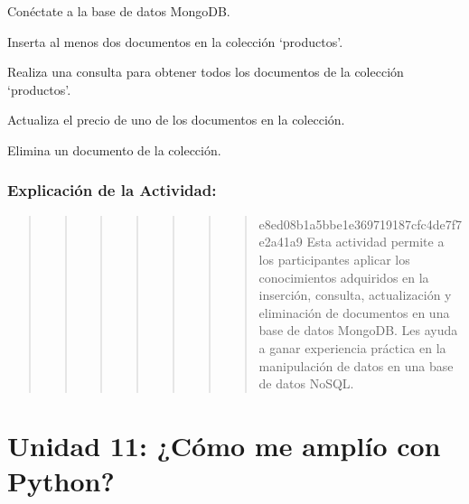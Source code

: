 \documentclass[
  a4paper,
  DIV=11,
  numbers=noendperiod,
  onepage,
  openany]{scrreprt}
\begin{document}
\begin{tcolorbox}[enhanced jigsaw, colbacktitle=quarto-callout-important-color!10!white, toprule=.15mm, leftrule=.75mm, titlerule=0mm, opacityback=0, rightrule=.15mm, opacitybacktitle=0.6, breakable, left=2mm, coltitle=black, title=\textcolor{quarto-callout-important-color}{\faExclamation}\hspace{0.5em}{Actividad Práctica:}, toptitle=1mm, bottomtitle=1mm, arc=.35mm, bottomrule=.15mm, colback=white, colframe=quarto-callout-important-color-frame]

Conéctate a la base de datos MongoDB.

Inserta al menos dos documentos en la colección `productos'.

Realiza una consulta para obtener todos los documentos de la colección
`productos'.

Actualiza el precio de uno de los documentos en la colección.

Elimina un documento de la colección.

\end{tcolorbox}

\hypertarget{explicaciuxf3n-de-la-actividad-77}{%
\section{Explicación de la
Actividad:}\label{explicaciuxf3n-de-la-actividad-77}}

\begin{quote}
\begin{quote}
\begin{quote}
\begin{quote}
\begin{quote}
\begin{quote}
\begin{quote}
e8ed08b1a5bbe1e369719187cfc4de7f7e2a41a9 Esta actividad permite a los
participantes aplicar los conocimientos adquiridos en la inserción,
consulta, actualización y eliminación de documentos en una base de datos
MongoDB. Les ayuda a ganar experiencia práctica en la manipulación de
datos en una base de datos NoSQL.
\end{quote}
\end{quote}
\end{quote}
\end{quote}
\end{quote}
\end{quote}
\end{quote}

\part{Unidad 11: ¿Cómo me amplío con Python?}
\end{document}
